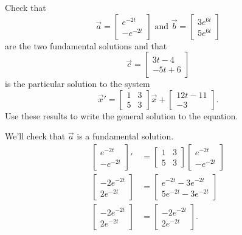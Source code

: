 \begin{example}
	Check that 
	\begin{equation*}
		\vec{a} = \begin{bmatrix}
			e^{-2t} \\
			-e^{-2t}
		\end{bmatrix} \text{ and } \vec{b} = \begin{bmatrix}
			3e^{6t} \\
			5e^{6t}
		\end{bmatrix}
	\end{equation*} 
	are the two fundamental solutions and that
	\begin{equation*}
		\vec{c} = \begin{bmatrix}
			3t - 4 \\
			-5t + 6
		\end{bmatrix}
	\end{equation*}
	is the particular solution to the system
	\begin{equation*}
		\vec{x}' = \begin{bmatrix}
			1 & 3 \\
			5 & 3
		\end{bmatrix} \vec{x} + \begin{bmatrix}
			12t - 11 \\
			-3
		\end{bmatrix}.
	\end{equation*}
	Use these results to write the general solution to the equation.
\end{example}
\noindent
We'll check that $\vec{a}$ is a fundamental solution.
\begin{align*}
	\begin{bmatrix}
		e^{-2t} \\
		-e^{-2t}
	\end{bmatrix}' &= \begin{bmatrix}
		1 & 3 \\
		5 & 3
	\end{bmatrix} \begin{bmatrix}
		e^{-2t} \\
		-e^{-2t}
	\end{bmatrix} \\
	\begin{bmatrix}
		-2e^{-2t} \\
		2e^{-2t}
	\end{bmatrix} &= \begin{bmatrix}
		e^{-2t} - 3e^{-2t} \\
		5e^{-2t} - 3e^{-2t}
	\end{bmatrix} \\
	\begin{bmatrix}
		-2e^{-2t} \\
		2e^{-2t}
	\end{bmatrix} &= \begin{bmatrix}
		-2e^{-2t} \\
		2e^{-2t}
	\end{bmatrix}.
\end{align*}
